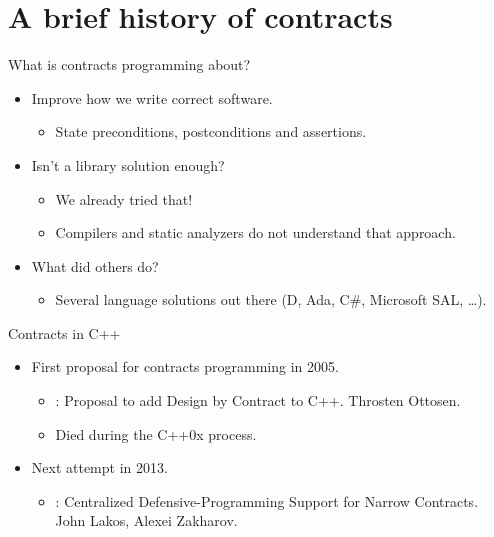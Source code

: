 \section{A brief history of contracts}

\begin{frame}[t,fragile]{What is contracts programming about?}
\begin{itemize}
  \item Improve how we write correct software.
    \begin{itemize}
      \item State preconditions, postconditions and assertions.
    \end{itemize}

  \vfill\pause
  \item Isn't a library solution enough?
    \pause
    \begin{itemize}
      \item We already tried that!
      \item Compilers and static analyzers do not understand that approach.
    \end{itemize}

  \vfill\pause
  \item What did others do?
    \pause
    \begin{itemize}
      \item Several language solutions out there (D, Ada, C\#, Microsoft SAL, \ldots).
    \end{itemize}
\end{itemize}
\end{frame}

\begin{frame}[t]{Contracts in C++}
\begin{itemize}
  \item First proposal for contracts programming in 2005.
    \begin{itemize}
      \item {}: Proposal to add Design by Contract to C++.
            Throsten Ottosen.
      \item Died during the C++0x process.
    \end{itemize}

  \vfill\pause
  \item Next attempt in 2013.
    \begin{itemize}
      \item {}: Centralized Defensive-Programming Support for
Narrow Contracts.
            John Lakos, Alexei Zakharov.
    \end{itemize}
\end{itemize}
\end{frame}

